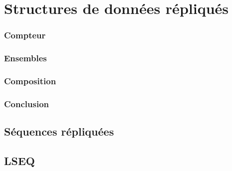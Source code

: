 
\part{Structures de données répliqués}









\section{Compteur}
\section{Ensembles}
\section{Composition}
\section{Conclusion}

\chapter{Séquences répliquées}
\label{repl:chap:sequences}
\minitoc





\chapter{LSEQ}
\label{repl:chap:lseq}
\minitoc




